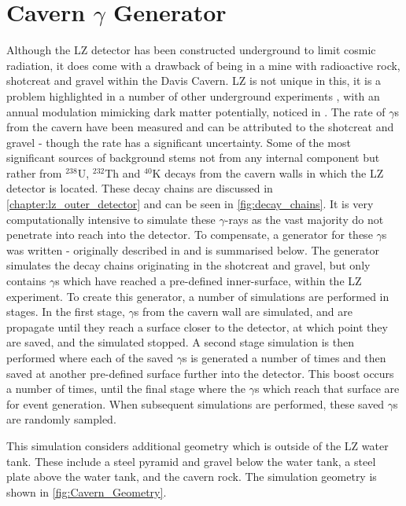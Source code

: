 \section{Cavern $\gamma$ Generator}
\label{sec:cavern_gamma_generator}

\par
Although the LZ detector has been constructed underground to limit cosmic radiation, it does come with a drawback of being in a mine with radioactive rock, shotcreat and gravel within the Davis Cavern.
LZ is not unique in this, it is a problem highlighted in a number of other underground experiments \cite{cavern_gamma_annual_modulation_CoGeNT_ref, cavern_gammas_in_Soudan_mine_ref}, with an annual modulation mimicking dark matter potentially, noticed in \cite{cavern_gamma_annual_modulation_CoGeNT_ref}.
The rate of $\gamma$s from the cavern have been measured and can be attributed to the shotcreat and gravel \cite{LZ_Gamma_Ray_Background_ref} - though the rate has a significant uncertainty.
Some of the most significant sources of background stems not from any internal component but rather from $^{238}$U, $^{232}$Th and $^{40}$K decays from the cavern walls in which the LZ detector is located.
These decay chains are discussed in \autoref{chapter:lz_outer_detector} and can be seen in \autoref{fig:decay_chains}.
It is very computationally intensive to simulate these $\gamma$-rays as the vast majority do not penetrate into reach into the detector.
To compensate, a generator for these $\gamma$s was written - originally described in \cite{rg_generator_ref} and is summarised below.
The generator simulates the decay chains originating in the shotcreat and gravel, but only contains $\gamma$s which have reached a pre-defined inner-surface, within the LZ experiment.
To create this generator, a number of simulations are performed in stages.
In the first stage, $\gamma$s from the cavern wall are simulated, and are propagate until they reach a surface closer to the detector, at which point they are saved, and the simulated stopped.
A second stage simulation is then performed where each of the saved $\gamma$s is generated a number of times and then saved at another pre-defined surface further into the detector.
This boost occurs a number of times, until the final stage where the $\gamma$s which reach that surface are for event generation.
When subsequent simulations are performed, these saved $\gamma$s are randomly sampled. 

\par
This simulation considers additional geometry which is outside of the LZ water tank.
These include a steel pyramid and gravel below the water tank, a steel plate above the water tank, and the cavern rock.
The simulation geometry is shown in \autoref{fig:Cavern_Geometry}.

